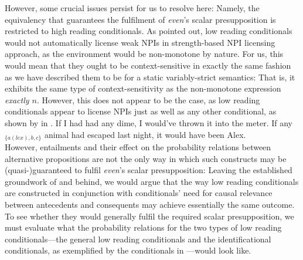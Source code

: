 However, some crucial issues persist for us to resolve here: Namely, the equivalency that guarantees the fulfilment of \textit{even}'s scalar presupposition is restricted to high reading conditionals. As \textcite{Walker2015} pointed out, low reading conditionals would not automatically license weak NPIs in  strength-based NPI licensing approach, as the environment would be non-monotone by nature. For us, this would mean that they ought to be context-sensitive in exactly the same fashion as we have described them to be for a static variably-strict semantics: That is, it exhibits the same type of context-sensitivity as the non-monotone expression \textit{exactly $n$}. However, this does not appear to be the case, as low reading conditionals appear to license NPIs just as well as any other conditional, as shown by \textcite{Walker2015} in .%
\pex[nopreamble=true]\label{ex:lowreading-npi}%
\a{} If I had had any dime, I would've thrown it into the meter.\label{ex:lowreading-npi1}
\a{} If any$_{\{a(lex),b,c\}}$ animal had escaped last night, it would have been Alex.\\\emptyfill\parencite[adapted from][p.~300]{Walker2015}\label{ex:lowreading-npi2}
\xe
However, entailments and their effect on the probability relations between alternative propositions are not the only way in which such constructs may be (quasi-)guaranteed to fulfil \textit{even}'s scalar presupposition: Leaving the established groundwork of \textcite{vanRooij2006} and \textcite{Walker2015} behind, we would argue that the way low reading conditionals are constructed in conjunction with conditionals' need for causal relevance between antecedents and consequents may achieve essentially the same outcome. To see whether they would generally fulfil the required scalar presupposition, we must evaluate what the probability relations for the two types of low reading conditionals---the general low reading conditionals and the identificational conditionals, as exemplified by the conditionals in ---would look like.

